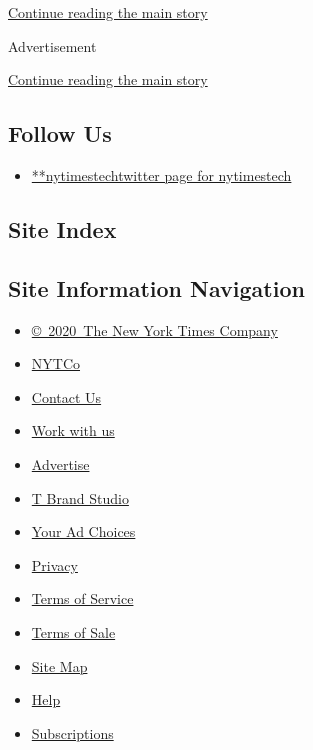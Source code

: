 \protect\hyperlink{after-mid2}{Continue reading the main story}

Advertisement

\protect\hyperlink{after-mktg}{Continue reading the main story}

\hypertarget{follow-us}{%
\subsection{Follow Us}\label{follow-us}}

\begin{itemize}
\tightlist
\item
  \href{https://twitter.com/nytimestech}{**nytimestechtwitter page for
  nytimestech}
\end{itemize}

\hypertarget{site-index}{%
\subsection{Site Index}\label{site-index}}

\hypertarget{site-information-navigation}{%
\subsection{Site Information
Navigation}\label{site-information-navigation}}

\begin{itemize}
\tightlist
\item
  \href{https://help.nytimes.com/hc/en-us/articles/115014792127-Copyright-notice}{©~2020~The
  New York Times Company}
\end{itemize}

\begin{itemize}
\tightlist
\item
  \href{https://www.nytco.com/}{NYTCo}
\item
  \href{https://help.nytimes.com/hc/en-us/articles/115015385887-Contact-Us}{Contact
  Us}
\item
  \href{https://www.nytco.com/careers/}{Work with us}
\item
  \href{https://nytmediakit.com/}{Advertise}
\item
  \href{http://www.tbrandstudio.com/}{T Brand Studio}
\item
  \href{https://www.nytimes.com/privacy/cookie-policy\#how-do-i-manage-trackers}{Your
  Ad Choices}
\item
  \href{https://www.nytimes.com/privacy}{Privacy}
\item
  \href{https://help.nytimes.com/hc/en-us/articles/115014893428-Terms-of-service}{Terms
  of Service}
\item
  \href{https://help.nytimes.com/hc/en-us/articles/115014893968-Terms-of-sale}{Terms
  of Sale}
\item
  \href{https://spiderbites.nytimes.com}{Site Map}
\item
  \href{https://help.nytimes.com/hc/en-us}{Help}
\item
  \href{https://www.nytimes.com/subscription?campaignId=37WXW}{Subscriptions}
\end{itemize}
